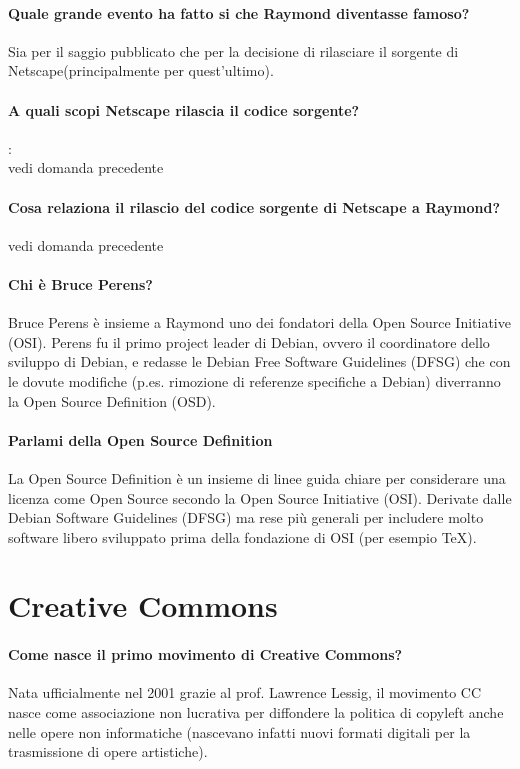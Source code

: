 \documentclass[a4paper]{article}
\begin{document}
		\paragraph{Quale grande evento ha fatto si che Raymond diventasse famoso?\\}
		Sia per il saggio pubblicato che per la decisione di rilasciare il sorgente di Netscape(principalmente per quest'ultimo).
		
		\paragraph{A quali scopi Netscape rilascia il codice sorgente?}
		: \\ vedi domanda precedente
		\paragraph{Cosa relaziona il rilascio del codice sorgente di Netscape a Raymond?}
		 vedi domanda precedente
		
		\paragraph{Chi è Bruce Perens?}
		Bruce Perens è insieme a Raymond uno dei fondatori della Open Source 
		Initiative (OSI). Perens fu il primo project leader di Debian, ovvero
		il coordinatore dello sviluppo di Debian, e redasse 
		le Debian Free Software Guidelines (DFSG) che con le dovute modifiche
		(p.es. rimozione di referenze specifiche a Debian) diverranno la 
		Open Source Definition (OSD).

		\paragraph{Parlami della Open Source Definition}
		La Open Source Definition è un insieme di linee guida chiare per 
		considerare una licenza come Open Source secondo la Open Source 
		Initiative (OSI). Derivate dalle Debian Software Guidelines (DFSG)
		ma rese più generali per includere molto software libero sviluppato 
		prima della fondazione di OSI (per esempio TeX).
		
	\section{Creative Commons}
	
		\paragraph{Come nasce il primo movimento di Creative Commons?}
			Nata ufficialmente nel 2001 grazie al prof. Lawrence Lessig, il movimento CC nasce come associazione non lucrativa per diffondere la politica di copyleft anche nelle opere non informatiche (nascevano infatti nuovi formati digitali per la trasmissione di opere artistiche). 
			
\end{document}
